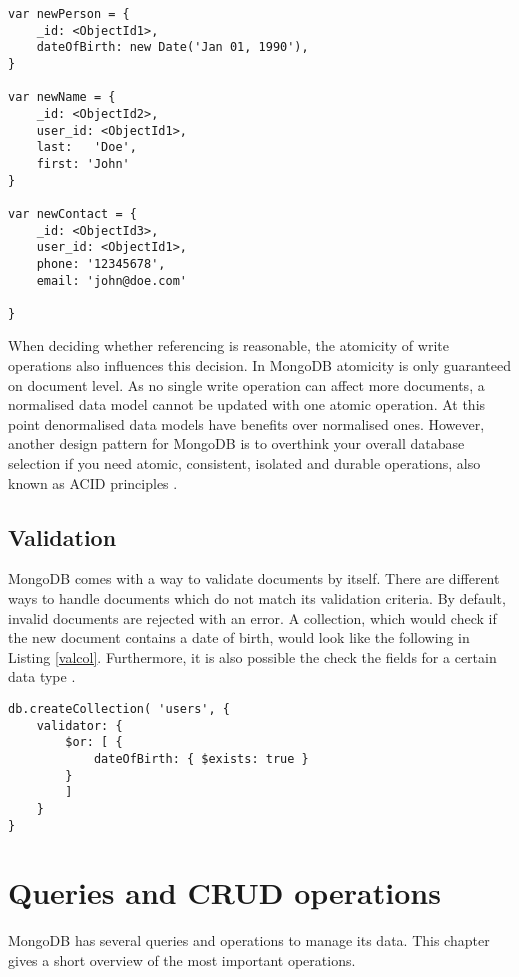 \begin{lstlisting}[frame=single, caption=Referencing Documents, label=refdoc]
var newPerson = {
	_id: <ObjectId1>,
	dateOfBirth: new Date('Jan 01, 1990'), 
}

var newName = {
	_id: <ObjectId2>,
	user_id: <ObjectId1>,	
    last:	'Doe', 
    first: 'John'
}

var newContact = {
    _id: <ObjectId3>,
    user_id: <ObjectId1>,	
    phone: '12345678',
	email: 'john@doe.com'

}
\end{lstlisting}

When deciding whether referencing is reasonable, the atomicity of write operations also influences this decision. In MongoDB atomicity is only guaranteed on document level. As no single write operation can affect more documents, a normalised data model cannot be updated with one atomic operation. At this point denormalised data models have benefits over normalised ones. However, another design pattern for MongoDB is to overthink your overall database selection if you need atomic, consistent, isolated and durable operations, also known as ACID principles \cite{mdbinaction}. 

\subsection{Validation}
MongoDB comes with a way to validate documents by itself. There are different ways to handle documents which do not match its validation criteria. By default, invalid documents are rejected with an error. A collection, which would check if the new document contains a date of birth, would look like the following in Listing \ref{valcol}. Furthermore, it is also possible the check the fields for a certain data type \cite{mdbdocu}.

\begin{lstlisting}[frame=single, caption=Validation for Collections, label=valcol]
db.createCollection( 'users', {
	validator: { 
	    $or: [ { 
	        dateOfBirth: { $exists: true } 
	    } 
        ] 
    }
}
\end{lstlisting}
		
\section{Queries and CRUD operations}
MongoDB has several queries and operations to manage its data. This chapter gives a short overview of the most important operations.

